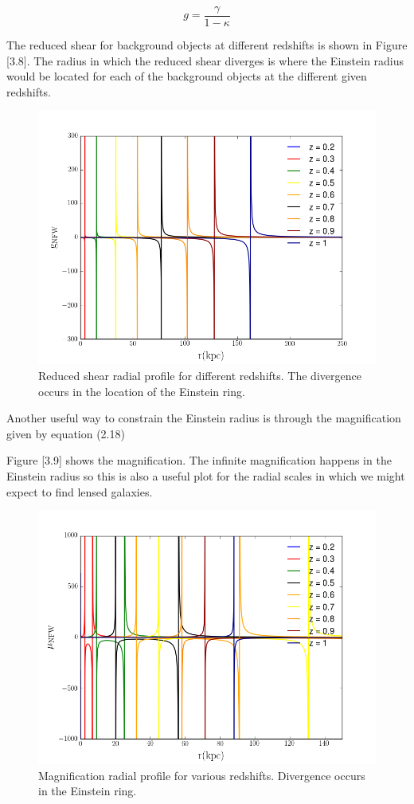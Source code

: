 \begin{equation}
g=\frac{\gamma}{1-\kappa}
\end{equation}

The reduced shear for background objects at different redshifts is shown in Figure [3.8]. The radius in which the reduced shear diverges is where the Einstein radius would be located for each of the background objects at the different given redshifts. 

\begin{figure}[H]
\centering
\includegraphics[width=12cm]{images/Reduced_Shear.png}
\caption[Reduced shear radial]{Reduced shear radial profile for different redshifts. The divergence occurs in the location of the Einstein ring.}
\end{figure}

Another useful way to constrain the Einstein radius is through the magnification given by equation (2.18)
 
 Figure [3.9] shows the magnification. The infinite magnification happens in the Einstein radius so this is also a useful plot for the radial scales in which we might expect to find lensed galaxies.

\begin{figure}[H]
\centering
\includegraphics[width=12cm]{images/Magnification.png}
\caption[Magnification radial profile]{Magnification radial profile for various redshifts. Divergence occurs in the Einstein ring.}
\end{figure}

